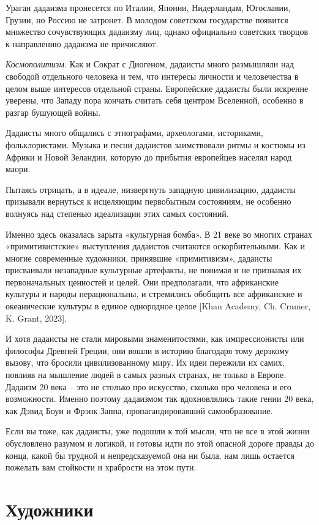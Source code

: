 Ураган дадаизма пронесется по Италии, Японии, Нидерландам, Югославии, Грузии, но Россию не затронет. В молодом советском государстве появится множество сочувствующих дадаизму лиц, однако официально советских творцов к направлению дадаизма не причисляют.

\textit{Космополитизм.}
Как и Сократ с Диогеном, дадаисты много размышляли над свободой отдельного человека и тем, что интересы личности и человечества в целом выше интересов отдельной страны. Европейские дадаисты были искренне уверены, что Западу пора кончать считать себя центром Вселенной, особенно в разгар бушующей войны.

Дадаисты много общались с этнографами, археологами, историками, фольклористами. Музыка и песни дадаистов заимствовали ритмы и костюмы из Африки и Новой Зеландии, которую до прибытия европейцев населял народ маори.

Пытаясь отрицать, а в идеале, низвергнуть западную цивилизацию, дадаисты призывали вернуться к исцеляющим первобытным состояниям, не особенно волнуясь над степенью идеализации этих самых состояний.

Именно здесь оказалась зарыта «культурная бомба». В 21 веке во многих странах «примитивистские» выступления дадаистов считаются оскорбительными. Как и многие современные художники, принявшие «примитивизм», дадаисты присваивали незападные культурные артефакты, не понимая и не признавая их первоначальных ценностей и целей. Они предполагали, что африканские культуры и народы нерациональны, и стремились обобщить все африканские и океанические культуры в единое однородное целое [Khan Academy, Ch. Cramer, K. Grant, 2023].

И хотя дадаисты не стали мировыми знаменитостями, как импрессионисты или философы Древней Греции, они вошли в историю благодаря тому дерзкому вызову, что бросили цивилизованному миру. Их идеи пережили их самих, повлияв на мышление людей в самых разных странах, не только в Европе. Дадаизм 20 века – это не столько про искусство, сколько про человека и его возможности. Именно поэтому дадаизмом так вдохновлялись такие гении 20 века, как Дэвид Боуи и Фрэнк Заппа, пропагандировавший самообразование.

Если вы тоже, как дадаисты, уже подошли к той мысли, что не все в этой жизни обусловлено разумом и логикой, и готовы идти по этой опасной дороге правды до конца, какой бы трудной и непредсказуемой она ни была, нам лишь остается пожелать вам стойкости и храбрости на этом пути.


\newpage
\section{Художники}
